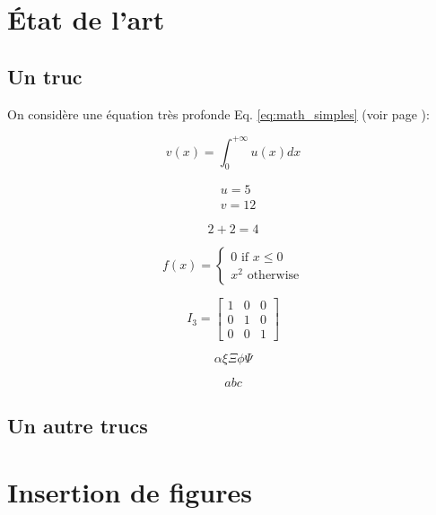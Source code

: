 \documentclass[a4paper, twoside]{article}
\begin{document}
\section{État de l'art}
\subsection{Un truc}

On considère une équation très profonde Eq. \ref{eq:math_simples} (voir page \pageref{eq:math_simples}):

$$ %
v(x) = \int_{0}^{+\infty} u(x) dx 
$$ %

\begin{align}
& u  =   5 \\
& v = 12
\end{align}

\begin{equation}
2+ 2 = 4
\label{eq:math_simples}
\end{equation}

\begin{equation}
f(x) = \left\lbrace 
\begin{split}
0 \mbox{ if } x \leq 0 \\
x^2 \mbox { otherwise}
\end{split}
\right.
\end{equation}


$$
I_3 = 
\begin{bmatrix}
1 & 0 & 0 \\
0 & 1 & 0 \\
0 & 0 & 1 
\end{bmatrix}
$$

$$
\alpha \xi \Xi \phi \Psi
$$

$$
a b c
$$

\subsection{Un autre trucs}




\section{Insertion de figures}
\label{sec:figures}
\end{document}
